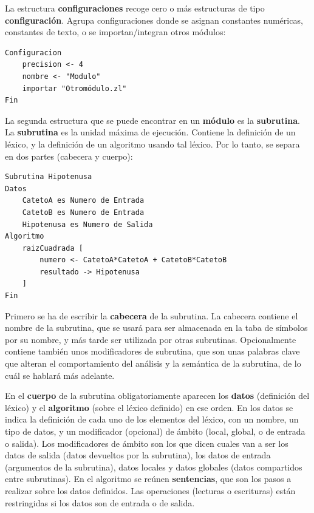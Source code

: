 \documentclass{report}
\begin{document}
	\vspace{10px}
	
	La estructura \textbf{configuraciones} recoge cero o más estructuras de tipo \textbf{configuración}. Agrupa configuraciones donde se asignan constantes numéricas, constantes de texto, o se importan/integran otros módulos:
	
	\vspace{10px}
	
\begin{BVerbatim}
Configuracion
	precision <- 4
	nombre <- "Modulo"
	importar "Otromódulo.zl"
Fin
\end{BVerbatim}
	
	La segunda estructura que se puede encontrar en un \textbf{módulo} es la \textbf{subrutina}. La \textbf{subrutina} es la unidad máxima de ejecución. Contiene la definición de un léxico, y la definición de un algoritmo usando tal léxico. Por lo tanto, se separa en dos partes (cabecera y cuerpo):
	
\begin{BVerbatim}
Subrutina Hipotenusa
Datos
	CatetoA es Numero de Entrada
	CatetoB es Numero de Entrada
	Hipotenusa es Numero de Salida
Algoritmo
	raizCuadrada [
		numero <- CatetoA*CatetoA + CatetoB*CatetoB
		resultado -> Hipotenusa
	]
Fin
\end{BVerbatim}

	\vspace{10px}
	
	Primero se ha de escribir la \textbf{cabecera} de la subrutina. La cabecera contiene el nombre de la subrutina, que se usará para ser almacenada en la taba de símbolos por su nombre, y más tarde ser utilizada por otras subrutinas. Opcionalmente contiene también unos modificadores de subrutina, que son unas palabras clave que alteran el comportamiento del análisis y la semántica de la subrutina, de lo cuál se hablará más adelante.
	
	\vspace{10px}
	
	En el \textbf{cuerpo} de la subrutina obligatoriamente aparecen los \textbf{datos} (definición del léxico) y el \textbf{algoritmo} (sobre el léxico definido) en ese orden. En los datos se indica la definición de cada uno de los elementos del léxico, con un nombre, un tipo de datos, y un modificador (opcional) de ámbito (local, global, o de entrada o salida). Los modificadores de ámbito son los que dicen cuales van a ser los datos de salida (datos devueltos por la subrutina), los datos de entrada (argumentos de la subrutina), datos locales y datos globales (datos compartidos entre subrutinas). En el algoritmo se reúnen \textbf{sentencias}, que son los pasos a realizar sobre los datos definidos. Las operaciones (lecturas o escrituras) están restringidas si los datos son de entrada o de salida.   
	
\end{document}
